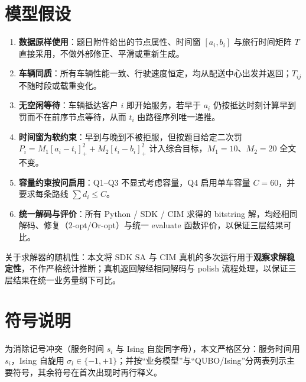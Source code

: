\documentclass[UTF8,12pt,a4paper]{ctexart}
\begin{document}
\section{模型假设}

\begin{enumerate}
    \item[(1)] \textbf{数据原样使用}：题目附件给出的节点属性、时间窗 $[a_i,b_i]$ 与旅行时间矩阵 $T$ 直接采用，不做外部修正、平滑或重新生成。
    \item[(2)] \textbf{车辆同质}：所有车辆性能一致、行驶速度恒定，均从配送中心出发并返回；$T_{ij}$ 不随时段或载重变化。
    \item[(3)] \textbf{无空闲等待}：车辆抵达客户 $i$ 即开始服务，若早于 $a_i$ 仍按抵达时刻计算早到罚而不在前序节点等待，从而 $t_i$ 由路径序列唯一递推。
    \item[(4)] \textbf{时间窗为软约束}：早到与晚到不被拒服，但按题目给定二次罚 $P_i=M_1[a_i\!-\!t_i]_+^2+M_2[t_i\!-\!b_i]_+^2$ 计入综合目标，$M_1=10$、$M_2=20$ 全文不变。
    \item[(5)] \textbf{容量约束按问启用}：Q1--Q3 不显式考虑容量，Q4 启用单车容量 $C=60$，并要求每条路线 $\sum d_i\!\le\!C$。
    \item[(6)] \textbf{统一解码与评价}：所有 Python / SDK / CIM 求得的 bitstring 解，均经相同解码、修复（2-opt/Or-opt）与统一 evaluate 函数评价，以保证三层结果可比。
\end{enumerate}

\noindent 关于求解器的随机性：本文将 SDK SA 与 CIM 真机的多次运行用于\textbf{观察求解稳定性}，不作严格统计推断；真机返回解经相同解码与 polish 流程处理，以保证三层结果在统一业务量纲下可比。

\section{符号说明}

为消除记号冲突（服务时间 $s_i$ 与 Ising 自旋同字母），本文严格区分：服务时间用 $s_i$，Ising 自旋用 $\sigma_l\!\in\!\{-1,+1\}$；并按``业务模型''与``QUBO/Ising''分两表列示主要符号，其余符号在首次出现时再行释义。
\end{document}
